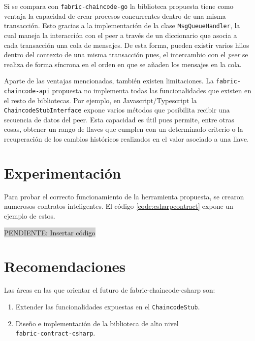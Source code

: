 Si se compara con \texttt{fabric-chaincode-go} la biblioteca propuesta tiene como ventaja la capacidad de crear procesos concurrentes dentro de una misma transacción. Esto gracias a la implementación de la clase \texttt{MsgQueueHandler}, la cual maneja la interacción con el peer a través de un diccionario que asocia a cada transacción una cola de mensajes. De esta forma, pueden existir varios hilos dentro del contexto de una misma transacción pues, el intercambio con el \textit{peer} se realiza de forma síncrona en el orden en que se añaden los mensajes en la cola.

Aparte de las ventajas mencionadas, también existen limitaciones.
La \texttt{fabric-chaincode-api} propuesta no implementa todas las funcionalidades que existen en el resto de bibliotecas. Por ejemplo, en Javascript/Typescript la \texttt{ChaincodeStubInterface} expone varios métodos que posibilita recibir una secuencia de datos del peer. Esta capacidad es útil pues permite, entre otras cosas, obtener un rango de llaves que cumplen con un determinado criterio o la recuperación de los cambios históricos realizados en el valor asociado a una llave.

\section{Experimentación}

Para probar el correcto funcionamiento de la herramienta propuesta, se crearon numerosos contratos inteligentes. El código \ref{code:csharpcontract} expone un ejemplo de estos.

\colorbox{lightgray}{PENDIENTE: Insertar código}

\section{Recomendaciones}
Las áreas en las que orientar el futuro de fabric-chaincode-csharp son:
    
\begin{enumerate}
\item Extender las funcionalidades expuestas en el \texttt{ChaincodeStub}.
\item Diseño e implementación de la biblioteca de alto nivel\\ \texttt{fabric-contract-csharp}.
\end{enumerate}


%
%
%




